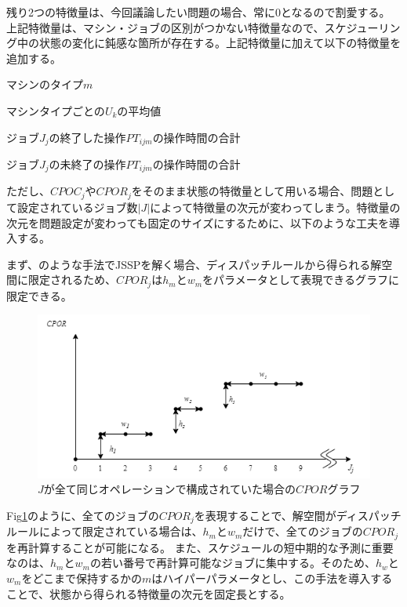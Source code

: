 \documentclass[twocolumn, a4j, 9pt, fleqn]{ltjsarticle}
\begin{document}
\noindent
残り2つの特徴量は、今回議論したい問題の場合、常に$0$となるので割愛する。
上記特徴量は、マシン・ジョブの区別がつかない特徴量なので、スケジューリング中の状態の変化に鈍感な箇所が存在する。上記特徴量に加えて以下の特徴量を追加する。

\begin{description}[style=multiline, leftmargin=10em]
  \item[$Type_{M_m}$] マシンのタイプ$m$
\end{description}

\begin{description}[style=multiline, leftmargin=15em]
  \item[$\bar{U_{k}} (Type_{M_k} = Type_{M_m})$] マシンタイプごとの$U_k$の平均値
  \item[$CPOC_j$] ジョブ$J_j$の終了した操作$PT_{ijm}$の操作時間の合計
  \item[$CPOR_j$] ジョブ$J_j$の未終了の操作$PT_{ijm}$の操作時間の合計
\end{description}

ただし、$CPOC_j$や$CPOR_j$をそのまま状態の特徴量として用いる場合、問題として設定されているジョブ数$|J|$によって特徴量の次元が変わってしまう。特徴量の次元を問題設定が変わっても固定のサイズにするために、以下のような工夫を導入する。

まず、\cite{shuluo2020}のような手法でJSSPを解く場合、ディスパッチルールから得られる解空間に限定されるため、$CPOR_j$は$h_m$と$w_m$をパラメータとして表現できるグラフに限定できる。

\begin{figure}
  \centering
  \includegraphics[width=\linewidth]{nninputfeatures01.png}
  \caption{$J$が全て同じオペレーションで構成されていた場合の$CPOR$グラフ}
  \label{fig:cpor}
\end{figure}
\newpage
Fig\ref{fig:cpor}のように、全てのジョブの$CPOR_j$を表現することで、解空間がディスパッチルールによって限定されている場合は、$h_m$と$w_m$だけで、全てのジョブの$CPOR_j$を再計算することが可能になる。
また、スケジュールの短中期的な予測に重要なのは、$h_m$と$w_m$の若い番号で再計算可能なジョブに集中する。そのため、$h_w$と$w_m$をどこまで保持するかの$m$はハイパーパラメータとし、この手法を導入することで、状態から得られる特徴量の次元を固定長とする。
\end{document}
